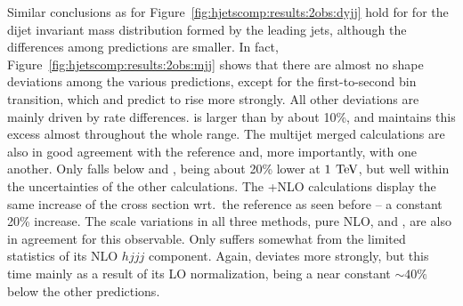 Similar conclusions as for Figure~\ref{fig:hjetscomp:results:2obs:dyjj} 
hold for for the dijet invariant mass distribution formed by the 
leading jets, although the differences among predictions are smaller.
In fact, Figure~\ref{fig:hjetscomp:results:2obs:mjj} shows that there
are almost no shape deviations among the various predictions, except
for the first-to-second bin transition, which \hjetscompPowheg and \hjetscompMGaMC
predict to rise more strongly. All other deviations are mainly driven
by rate differences. \hjetscompSherpa \hjetscompNNLOPS is larger than \hjetscompPowheg \hjetscompNNLOPS
by about 10\%, and maintains this excess almost throughout the whole
range. The multijet merged calculations are also in good agreement
with the \hjetscompPowheg reference and, more importantly, with one another. Only
\hjetscompMGaMC falls below \hjetscompHerwig and \hjetscompSherpa \hjetscompMEPSatNLO, being about 20\%
lower at $1\,\text{\:TeV}$, but well within the uncertainties of the other
calculations. The \hjetscompGoSam{}+\hjetscompSherpa NLO calculations display the same
increase of the cross section wrt.~the reference as seen before -- a
constant 20\% increase. The scale variations in all three methods,
pure NLO, \hjetscompMinlo and \hjetscompLoopsim, are also in agreement for this
observable. Only \hjetscompLoopsim suffers somewhat from the limited statistics
of its NLO $hjjj$ component. Again, \hjetscompHej deviates more strongly,
but this time mainly as a result of its LO normalization, being a
near constant $\sim 40\%$ below the other predictions.

